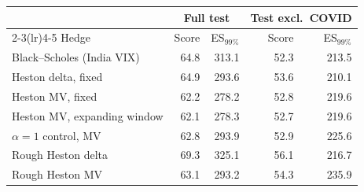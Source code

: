 \begin{tabular}{lrrrr}
\toprule
 & \multicolumn{2}{c}{Full test} & \multicolumn{2}{c}{Test excl.\ COVID} \\
\cmidrule(lr){2-3}\cmidrule(lr){4-5}
Hedge & Score & ES$_{99\%}$ & Score & ES$_{99\%}$ \\
\midrule
Black--Scholes (India VIX) & 64.8 & 313.1 & 52.3 & 213.5 \\
Heston delta, fixed & 64.9 & 293.6 & 53.6 & 210.1 \\
Heston MV, fixed & 62.2 & 278.2 & 52.8 & 219.6 \\
Heston MV, expanding window & 62.1 & 278.3 & 52.7 & 219.6 \\
$\alpha=1$ control, MV & 62.8 & 293.9 & 52.9 & 225.6 \\
Rough Heston delta & 69.3 & 325.1 & 56.1 & 216.7 \\
Rough Heston MV & 63.1 & 293.2 & 54.3 & 235.9 \\
\bottomrule
\end{tabular}
